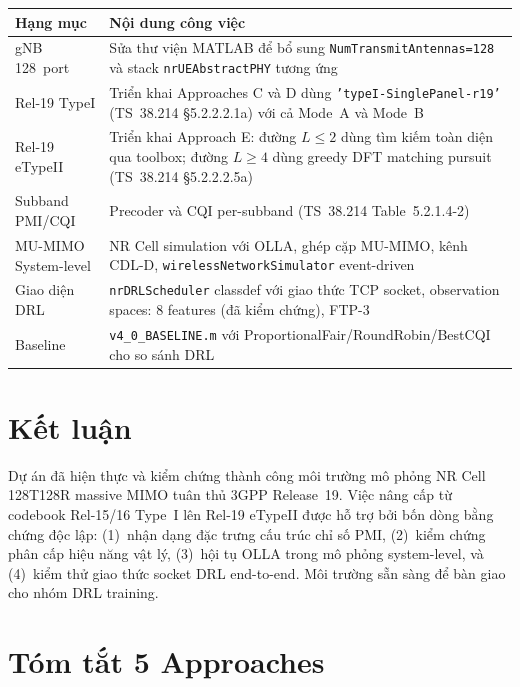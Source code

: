 \documentclass[12pt, a4paper]{article}
\begin{document}
\begin{center}
\begin{tabular}{L{3.5cm} L{10.5cm}}
\toprule
\textbf{Hạng mục} & \textbf{Nội dung công việc} \\
\midrule
gNB 128~port & Sửa thư viện MATLAB để bổ sung
  \texttt{NumTransmitAntennas=128} và stack \texttt{nrUEAbstractPHY}
  tương ứng \\[3pt]
Rel-19 TypeI & Triển khai Approaches C và D dùng
  \texttt{'typeI-SinglePanel-r19'} (TS~38.214 \S5.2.2.2.1a)
  với cả Mode~A và Mode~B \\[3pt]
Rel-19 eTypeII & Triển khai Approach E: đường $L \leq 2$ dùng tìm kiếm
  toàn diện qua toolbox; đường $L \geq 4$ dùng greedy DFT matching
  pursuit (TS~38.214 \S5.2.2.2.5a) \\[3pt]
Subband PMI/CQI & Precoder và CQI per-subband
  (TS~38.214 Table~5.2.1.4-2) \\[3pt]
MU-MIMO System-level & NR Cell simulation với OLLA, ghép cặp MU-MIMO,
  kênh CDL-D, \texttt{wirelessNetworkSimulator} event-driven \\[3pt]
Giao diện DRL & \texttt{nrDRLScheduler} classdef với giao thức TCP
  socket, observation spaces: 8 features (đã kiểm chứng), FTP-3 \\[3pt]
Baseline & \texttt{v4\_0\_BASELINE.m} với ProportionalFair/RoundRobin/BestCQI
  cho so sánh DRL \\
\bottomrule
\end{tabular}
\end{center}

\section{Kết luận}

Dự án đã hiện thực và kiểm chứng thành công môi trường mô phỏng NR
Cell 128T128R massive MIMO tuân thủ 3GPP Release~19. Việc nâng cấp
từ codebook Rel-15/16 Type~I lên Rel-19 eTypeII được hỗ trợ bởi
bốn dòng bằng chứng độc lập: (1)~nhận dạng đặc trưng cấu trúc
chỉ số PMI, (2)~kiểm chứng phân cấp hiệu năng vật lý, (3)~hội tụ
OLLA trong mô phỏng system-level, và (4)~kiểm thử giao thức socket
DRL end-to-end. Môi trường sẵn sàng để bàn giao cho nhóm DRL training.

\appendix
\section{Tóm tắt 5 Approaches}
\end{document}
